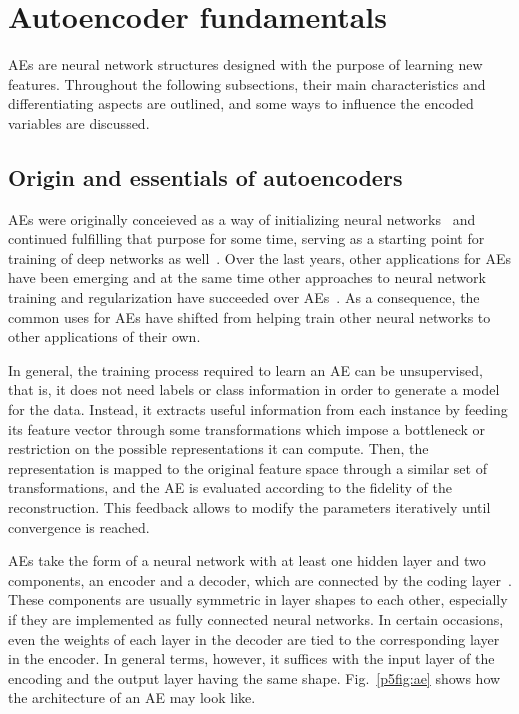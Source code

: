 \section{Autoencoder fundamentals}\label{p5sec:ae}

AEs are neural network structures designed with the purpose of learning new features. Throughout the following subsections, their main characteristics and differentiating aspects are outlined, and some ways to influence the encoded variables are discussed.

\subsection{Origin and essentials of autoencoders}

AEs were originally conceieved as a way of initializing neural networks~\cite{ballard} and continued fulfilling that purpose for some time, serving as a starting point for training of deep networks as well~\cite{hinton2006fast}. Over the last years, other applications for AEs have been emerging and at the same time other approaches to neural network training and regularization have succeeded over AEs~\cite{relu,dropout}. As a consequence,  the common uses for AEs have shifted from helping train other neural networks to other applications of their own.

In general, the training process required to learn an AE can be unsupervised, that is, it does not need labels or class information in order to generate a model for the data. Instead, it extracts useful information from each instance by feeding its feature vector through some transformations which impose a bottleneck or restriction on the possible representations it can compute. Then, the representation is mapped to the original feature space through a similar set of transformations, and the AE is evaluated according to the fidelity of the reconstruction. This feedback allows to modify the parameters iteratively until convergence is reached.

AEs take the form of a neural network with at least one hidden layer and two components, an encoder and a decoder, which are connected by the coding layer~\cite{charte-tutorial}. These components are usually symmetric in layer shapes to each other, especially if they are implemented as fully connected neural networks. In certain occasions, even the weights of each layer in the decoder are tied to the corresponding layer in the encoder. In general terms, however, it suffices with the input layer of the encoding and the output layer having the same shape. Fig.~\ref{p5fig:ae} shows how the architecture of an AE may look like.

